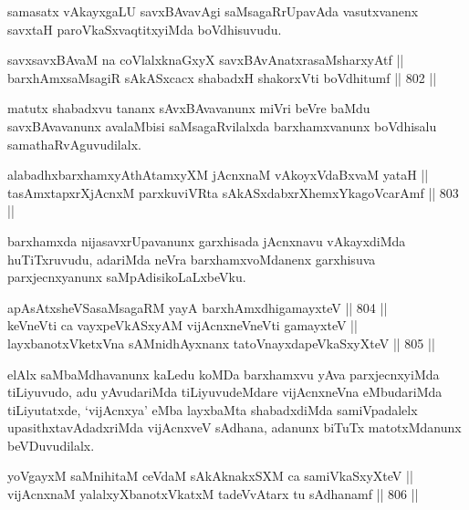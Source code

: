 \begin{artha}
samasatx vAkayxgaLU savxBAvavAgi saMsagaRrUpavAda vasutxvanenx savxtaH paroVkaSxvaqtitxyiMda boVdhisuvudu.
\end{artha}

\begin{shl}
savxsavxBAvaM na coVlalxknaGxyX savxBAvAnatxrasaMsharxyAtf || \\
barxhAmxsaMsagiR sAkASxcacx shabadxH shakorxVti boVdhitumf \hfill || 802 ||  
\end{shl}

\begin{artha}
matutx shabadxvu tananx sAvxBAvavanunx miVri beVre baMdu savxBAvavanunx avalaMbisi saMsagaRvilalxda barxhamxvanunx boVdhisalu samathaRvAguvudilalx.
\end{artha}

\begin{shl}
alabadhxbarxhamxyAthAtamxyXM jAcnxnaM vAkoyxVdaBxvaM yataH || \\
tasAmxtapxrXjAcnxM parxkuviVRta sAkASxdabxrXhemxYkagoVcarAmf \hfill || 803 ||  
\end{shl}

\begin{artha}
barxhamxda nijasavxrUpavanunx garxhisada jAcnxnavu vAkayxdiMda huTiTxruvudu, adariMda neVra barxhamxvoMdanenx garxhisuva parxjecnxyanunx saMpAdisikoLaLxbeVku.
\end{artha}


\begin{shl}
apAsAtxsheVSasaMsagaRM yayA barxhAmxdhigamayxteV \hfill || 804 ||  \\
keVneVti ca vayxpeVkASxyAM vijAcnxneVneVti gamayxteV || \\
layxbanotxVketxVna sAMnidhAyxnanx tatoV\s nayxdapeVkaSxyXteV \hfill || 805 ||  
\end{shl}

\begin{artha}
elAlx saMbaMdhavanunx kaLedu koMDa barxhamxvu yAva parxjecnxyiMda tiLiyuvudo, adu yAvudariMda tiLiyuvudeMdare vijAcnxneVna eMbudariMda tiLiyutatxde, `vijAcnxya' eMba layxbaMta shabadxdiMda samiVpadalelx upasithxtavAdadxriMda vijAcnxveV sAdhana, adanunx biTuTx matotxMdanunx beVDuvudilalx.
\end{artha}

\begin{shl}
yoVgayxM saMnihitaM ceVdaM sAkAknakxSXM ca samiVkaSxyXteV ||  \\
vijAcnxnaM yalalxyXbanotxVkatxM tadeVvAtarx tu sAdhanamf \hfill || 806 ||  
\end{shl}

